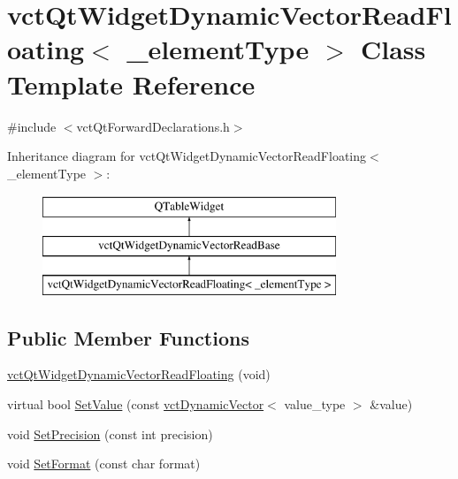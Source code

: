 \hypertarget{classvct_qt_widget_dynamic_vector_read_floating}{\section{vct\-Qt\-Widget\-Dynamic\-Vector\-Read\-Floating$<$ \-\_\-element\-Type $>$ Class Template Reference}
\label{classvct_qt_widget_dynamic_vector_read_floating}
}


{\ttfamily \#include $<$vct\-Qt\-Forward\-Declarations.\-h$>$}

Inheritance diagram for vct\-Qt\-Widget\-Dynamic\-Vector\-Read\-Floating$<$ \-\_\-element\-Type $>$\-:\begin{figure}[H]
\begin{center}
\leavevmode
\includegraphics[height=3.000000cm]{d4/d5c/classvct_qt_widget_dynamic_vector_read_floating}
\end{center}
\end{figure}
\subsection*{Public Member Functions}
\begin{DoxyCompactItemize}
\item 
\hyperlink{classvct_qt_widget_dynamic_vector_read_floating_a9c567f667c0a2d59e9db6f29b6b3b9ef}{vct\-Qt\-Widget\-Dynamic\-Vector\-Read\-Floating} (void)
\item 
virtual bool \hyperlink{classvct_qt_widget_dynamic_vector_read_floating_a1a7cf8f2f7acdf9f788789fbbbfb0ac4}{Set\-Value} (const \hyperlink{classvct_dynamic_vector}{vct\-Dynamic\-Vector}$<$ value\-\_\-type $>$ \&value)
\item 
void \hyperlink{classvct_qt_widget_dynamic_vector_read_floating_a0a2b96322cc857e357366fb8fc61d053}{Set\-Precision} (const int precision)
\item 
void \hyperlink{classvct_qt_widget_dynamic_vector_read_floating_aba4eaf5f416bc92ea6048d7f0dd1180b}{Set\-Format} (const char format)
\end{DoxyCompactItemize}


